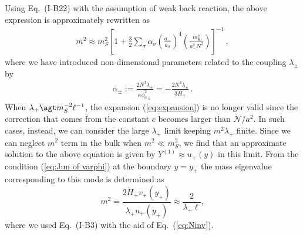 \documentclass[a4paper,showpacs,preprintnumbers,amsmath,amssymb]{revtex4}
\begin{document}
Using Eq.~(I-B22) with the assumption of weak back reaction, the above expression is approximately rewritten as 
\begin{eqnarray}
 m^2 \approx m_S^2
           \left[1 
     + \frac{3}{2} \sum_\sigma \alpha_\sigma \left(
                 \frac{a_-}{a_\sigma}\right)^4
                \left(\frac{m_S^2}
                {a_-^2 N^2} \right) \right]^{-1}\, ,
\label{eq:m2small}
\end{eqnarray} 
where we have introduced non-dimensional parameters related to the coupling
$\lambda_\pm$ by 
\begin{eqnarray}
 \alpha_\pm :=  \frac{2N^3 \lambda_\pm}{ \kappa \dot\phi_{0\pm}^2 } 
             = - \frac{2N^3 \lambda_\pm}{ 3 \dot H_\pm } \,. 
\label{eq:def. alpha}
\end{eqnarray}
When $\lambda_+ \agt m_S^{-2}\ell^{-1}$, the expansion
(\ref{eq:expansion}) is no longer valid since the correction that comes from the constant $c$ becomes larger than ${\mathcal N}/a^2$.
In such cases, instead, we can consider the large 
$\lambda_+$ limit keeping $m^2\lambda_+$ finite. 
Since we can neglect $m^2$ term in the bulk when $m^2 \ll m_S^2$, we find that an approximate solution to the above equation is given by $Y^{(1)} \approx u_+(y)$ in this limit. From the condition (\ref{eq:Jun of varphi}) at the boundary 
$y=y_+$ the 
mass eigenvalue corresponding to this mode is determined as 
\begin{equation}
 m^2=\frac{2\dot H_+ v_+(y_+)}{\lambda_+ u_+(y_+)}
   \approx \frac{2}{\lambda_+ \ell},  
\label{eq:m2limit}
\end{equation}
where we used Eq.~(I-B3) with the aid of Eq.~(\ref{eq:Ninv}).
\end{document}
